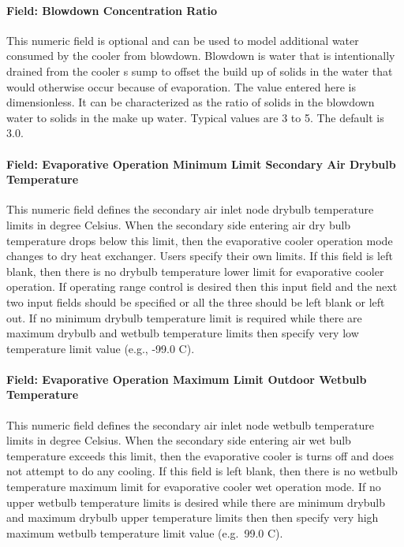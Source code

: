 \paragraph{Field: Blowdown Concentration Ratio}\label{field-blowdown-concentration-ratio-2-000}

This numeric field is optional and can be used to model additional water consumed by the cooler from blowdown. Blowdown is water that is intentionally drained from the cooler s sump to offset the build up of solids in the water that would otherwise occur because of evaporation. The value entered here is dimensionless. It can be characterized as the ratio of solids in the blowdown water to solids in the make up water. Typical values are 3 to 5. The default is 3.0.

\paragraph{Field: Evaporative Operation Minimum Limit Secondary Air Drybulb Temperature}\label{field-evaporative-operation-minimum-limit-drybulb-temperature}

This numeric field defines the secondary air inlet node drybulb temperature limits in degree Celsius. When the secondary side entering air dry bulb temperature drops below this limit, then the evaporative cooler operation mode changes to dry heat exchanger. Users specify their own limits. If this field is left blank, then there is no drybulb temperature lower limit for evaporative cooler operation. If operating range control is desired then this input field and the next two input fields should be specified or all the three should be left blank or left out. If no minimum drybulb temperature limit is required while there are maximum drybulb and wetbulb temperature limits then specify very low temperature limit value (e.g., -99.0 C).

\paragraph{Field: Evaporative Operation Maximum Limit Outdoor Wetbulb Temperature}\label{field-evaporative-operation-maximum-limit-wetbulb-temperature-1}

This numeric field defines the secondary air inlet node wetbulb temperature limits in degree Celsius. When the secondary side entering air wet bulb temperature exceeds this limit, then the evaporative cooler is turns off and does not attempt to do any cooling. If this field is left blank, then there is no wetbulb temperature maximum limit for evaporative cooler wet operation mode. If no upper wetbulb temperature limits is desired while there are minimum drybulb and maximum drybulb upper temperature limits then then specify very high maximum wetbulb temperature limit value (e.g.~99.0 C).

